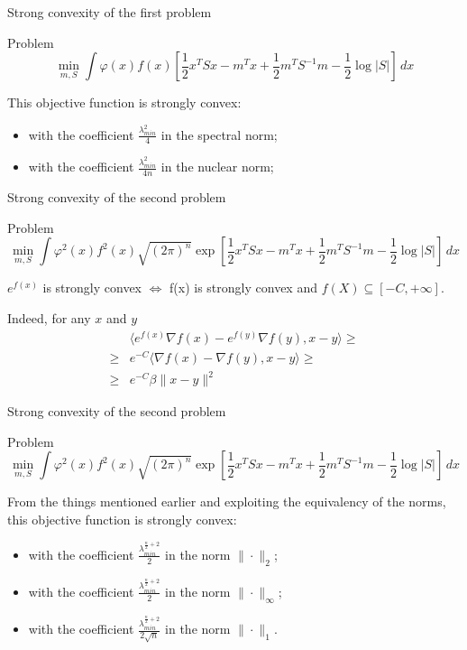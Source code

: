 \documentclass[10pt]{beamer}
\begin{document}
\begin{frame}{Strong convexity of the first problem}

\begin{block}{Problem}
\[
\min_{m,S} \int \varphi(x)f(x)\left[\frac12 x^TSx - m^Tx + \frac12 m^T S^{-1}m - \frac 12 \log |S|  \right] \, dx
\]
\end{block}

This objective function is strongly convex:
\begin{itemize}
\item with the coefficient $\frac{\lambda_{min}^2}{4}$ in the spectral norm;
\item with the coefficient $\frac{\lambda_{min}^2}{4n}$ in the nuclear norm;

\end{itemize}
\end{frame}


\begin{frame}{Strong convexity of the second problem}
\begin{block}{Problem}
\[
\min_{m,S} \int \varphi^2(x)f^2(x) \sqrt{(2\pi)^n} \exp \left[\frac12 x^TSx - m^Tx + \frac12 m^T S^{-1}m - \frac 12 \log |S|  \right] \, dx
\]
\end{block}

$e^{f(x)}$ is strongly convex $\Leftrightarrow$ f(x) is strongly convex and $f(X) \subseteq [-C, + \infty]$.

Indeed, for any $x$ and $y$
\begin{align*}
    &\langle e^{f(x)} \nabla f(x) - e^{f(y)} \nabla f(y), x-y \rangle \geq\\ 
    \geq & e^{-C} \langle \nabla f(x) - \nabla f(y), x-y \rangle \geq \\
    \geq & e^{-C} \beta \|x-y\|^2
\end{align*}

\end{frame}



\begin{frame}{Strong convexity of the second problem}
\begin{block}{Problem}
\[
\min_{m,S} \int \varphi^2(x)f^2(x) \sqrt{(2\pi)^n} \exp \left[\frac12 x^TSx - m^Tx + \frac12 m^T S^{-1}m - \frac 12 \log |S|  \right] \, dx
\]
\end{block}

From the things mentioned earlier and exploiting the equivalency of the norms, this objective function is strongly convex:
\begin{itemize}
\item with the coefficient $\frac{\lambda_{min}^{\frac n2+ 2}}{2}$ in the norm $\|\cdot\|_2$;
\item with the coefficient $\frac{\lambda_{min}^{\frac n2 + 2}}{2}$ in the norm $\|\cdot\|_{\infty}$;
\item with the coefficient $\frac{\lambda_{min}^{\frac n2 + 2}}{2 \sqrt{n}}$ in the norm $\|\cdot\|_{1}$.

\end{itemize}
\end{frame}
\end{document}

